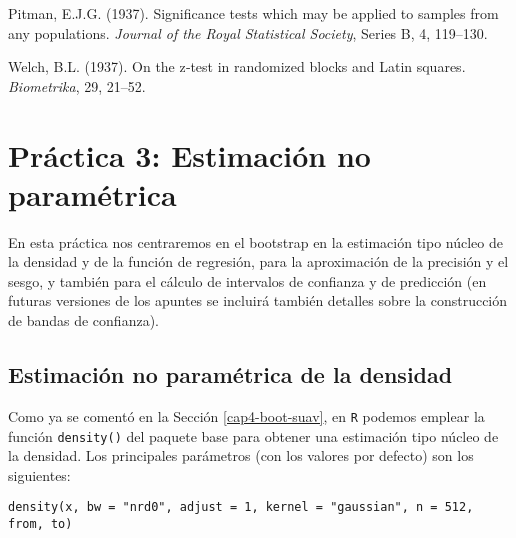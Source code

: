 \documentclass[
]{book}
\theoremstyle{definition}
\theoremstyle{definition}
\theoremstyle{definition}
\theoremstyle{remark}
\begin{document}
Pitman, E.J.G. (1937). Significance tests which may be applied to samples from any populations.
\emph{Journal of the Royal Statistical Society}, Series B, 4, 119--130.

Welch, B.L. (1937). On the z‐test in randomized blocks and Latin squares. \emph{Biometrika}, 29, 21--52.

\hypertarget{practica3}{%
\chapter{Práctica 3: Estimación no paramétrica}\label{practica3}}

En esta práctica nos centraremos en el bootstrap
en la estimación tipo núcleo de la densidad y de la función de regresión,
para la aproximación de la precisión y el sesgo,
y también para el cálculo de intervalos de confianza y de predicción
(en futuras versiones de los apuntes se incluirá también
detalles sobre la construcción de bandas de confianza).

\hypertarget{estimaciuxf3n-no-paramuxe9trica-de-la-densidad}{%
\section{Estimación no paramétrica de la densidad}\label{estimaciuxf3n-no-paramuxe9trica-de-la-densidad}}

Como ya se comentó en la Sección \ref{cap4-boot-suav},
en \texttt{R} podemos emplear la función \texttt{density()} del paquete base para obtener
una estimación tipo núcleo de la densidad.
Los principales parámetros (con los valores por defecto) son los siguientes:

\begin{verbatim}
density(x, bw = "nrd0", adjust = 1, kernel = "gaussian", n = 512, from, to)
\end{verbatim}
\end{document}
